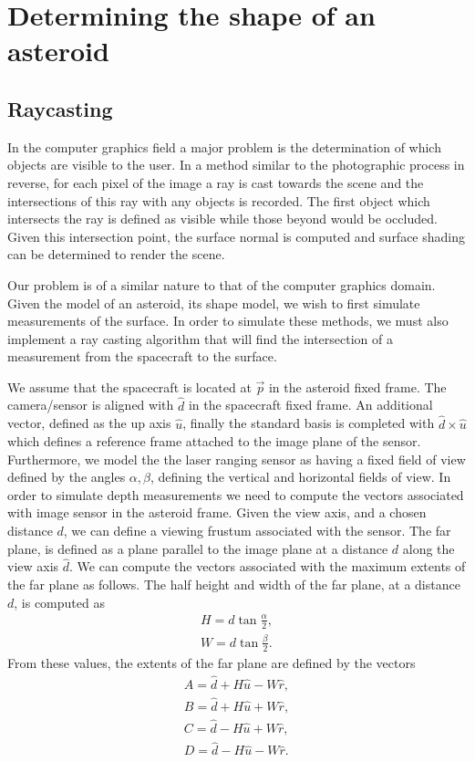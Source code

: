 
\chapter{Determining the shape of an asteroid}

\section{Raycasting}

In the computer graphics field a major problem is the determination of which objects are visible to the user.
In a method similar to the photographic process in reverse, for each pixel of the image a ray is cast towards the scene and the intersections of this ray with any objects is recorded.
The first object which intersects the ray is defined as visible while those beyond would be occluded.
Given this intersection point, the surface normal is computed and surface shading can be determined to render the scene.

Our problem is of a similar nature to that of the computer graphics domain.
Given the model of an asteroid, its shape model, we wish to first simulate measurements of the surface. 
In order to simulate these methods, we must also implement a ray casting algorithm that will find the intersection of a measurement from the spacecraft to the surface. 

We assume that the spacecraft is located at \( \vec p \) in the asteroid fixed frame.
The camera/sensor is aligned with \( \hat d \) in the spacecraft fixed frame.
An additional vector, defined as the up axis \( \hat u\), finally the standard basis is completed with \( \hat d \times \hat u \) which defines a reference frame attached to the image plane of the sensor.
Furthermore, we model the the laser ranging sensor as having a fixed field of view defined by the angles \( \alpha, \beta\), defining the vertical and horizontal fields of view.
In order to simulate depth measurements we need to compute the vectors associated with image sensor in the asteroid frame. 
Given the view axis, and a chosen distance \( d \), we can define a viewing frustum associated with the sensor. 
The far plane, is defined as a plane parallel to the image plane at a distance \( d \) along the view axis \( \hat d \).
We can compute the vectors associated with the maximum extents of the far plane as follows.
The half height and width of the far plane, at a distance \( d \), is computed as
\begin{align}
    H = d \tan \frac{\alpha}{2} , \\
    W = d \tan \frac{\beta}{2} .
\end{align}
From these values, the extents of the far plane are defined by the vectors
\begin{align}
    A = \hat d + H \hat u - W \hat r , \\
    B = \hat d + H \hat u + W \hat r, \\
    C = \hat d - H \hat  u + W \hat r, \\
    D = \hat d - H \hat u - W \hat r.
\end{align}







